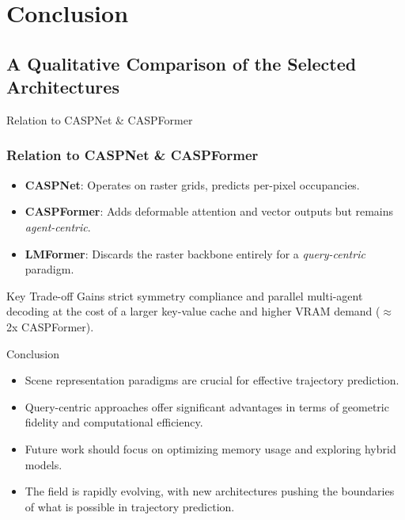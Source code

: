 \documentclass[10pt,aspectratio=169]{beamer}
\begin{document}
\section{Conclusion}

\subsection{A Qualitative Comparison of the Selected Architectures}

\begin{frame}{Relation to CASPNet \& CASPFormer}
    \frametitle{Relation to CASPNet \& CASPFormer}
    \begin{itemize}
        \item \textbf{CASPNet}: Operates on raster grids, predicts per-pixel occupancies.
        \item \textbf{CASPFormer}: Adds deformable attention and vector outputs but remains \emph{agent-centric}.
        \item \textbf{LMFormer}: Discards the raster backbone entirely for a \emph{query-centric} paradigm.
    \end{itemize}
    \vfill
    \begin{alertblock}{Key Trade-off}
    Gains strict symmetry compliance and parallel multi-agent decoding at the cost of a larger key-value cache and higher VRAM demand (\(\approx\)2x CASPFormer).
    \end{alertblock}
\end{frame}


\begin{frame}{Conclusion}
\begin{itemize}
    \item Scene representation paradigms are crucial for effective trajectory prediction.
    \item Query-centric approaches offer significant advantages in terms of geometric fidelity and computational efficiency.
    \item Future work should focus on optimizing memory usage and exploring hybrid models.
    \item The field is rapidly evolving, with new architectures pushing the boundaries of what is possible in trajectory prediction.
\end{itemize}
\end{frame}
\end{document}
